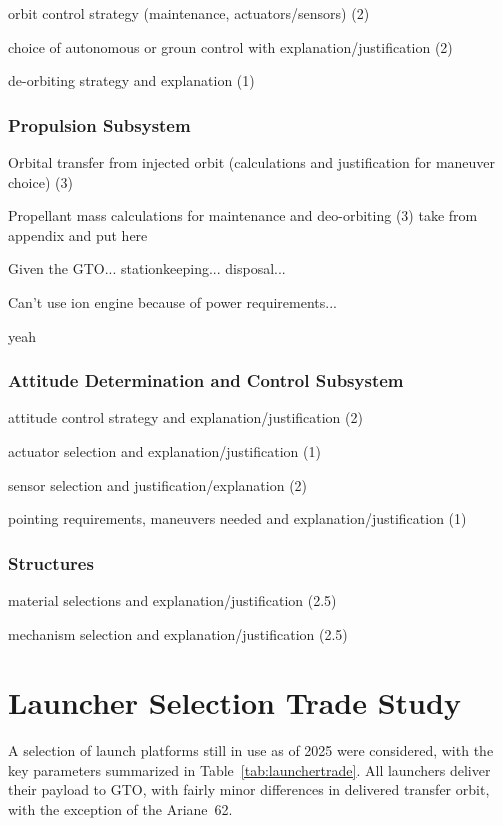 \documentclass[9pt]{article}
\begin{document}
orbit control strategy (maintenance, actuators/sensors) (2)

choice of autonomous or groun control with explanation/justification (2)

de-orbiting strategy and explanation (1)

\subsubsection{Propulsion Subsystem}
Orbital transfer from injected orbit (calculations and justification for maneuver choice) (3)

Propellant mass calculations for maintenance and deo-orbiting (3) take from appendix and put here

Given the GTO... stationkeeping... disposal...

Can't use ion engine because of power requirements...\cite{next}

yeah
\subsubsection{Attitude Determination and Control Subsystem}
attitude control strategy and explanation/justification (2)

actuator selection and explanation/justification (1)

sensor selection and justification/explanation (2)

pointing requirements, maneuvers needed and explanation/justification (1)

\subsubsection{Structures}
material selections and explanation/justification (2.5)

mechanism selection and explanation/justification (2.5)


\section{Launcher Selection Trade Study}
A selection of launch platforms still in use as of 2025 were considered, with the key parameters summarized in Table~\ref{tab:launchertrade}.
All launchers deliver their payload to GTO, with fairly minor differences in delivered transfer orbit, with the exception of the Ariane~62.
\end{document}
